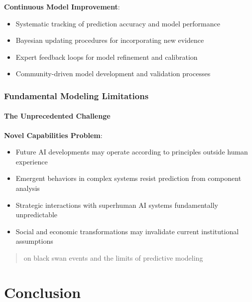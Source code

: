 \documentclass[
  11pt,
  letterpaper,
]{book}
\providecommand{\tightlist}{%
  \setlength{\itemsep}{0pt}\setlength{\parskip}{0pt}}
\begin{document}
\textbf{Continuous Model Improvement}:

\begin{itemize}
\tightlist
\item
  Systematic tracking of prediction accuracy and model performance
\item
  Bayesian updating procedures for incorporating new evidence
\item
  Expert feedback loops for model refinement and calibration
\item
  Community-driven model development and validation processes
\end{itemize}

\subsection{Fundamental Modeling
Limitations}\label{sec-fundamental-limitations}

\subsubsection{The Unprecedented
Challenge}\label{sec-unprecedented-challenge}

\textbf{Novel Capabilities Problem}:

\begin{itemize}
\tightlist
\item
  Future AI developments may operate according to principles outside
  human experience
\item
  Emergent behaviors in complex systems resist prediction from component
  analysis
\item
  Strategic interactions with superhuman AI systems fundamentally
  unpredictable
\item
  Social and economic transformations may invalidate current
  institutional assumptions
\end{itemize}

\begin{quote}
\textcite{taleb2007} on black swan events and the limits of predictive
modeling
\end{quote}


\chapter{Conclusion}\label{conclusion}
\end{document}
